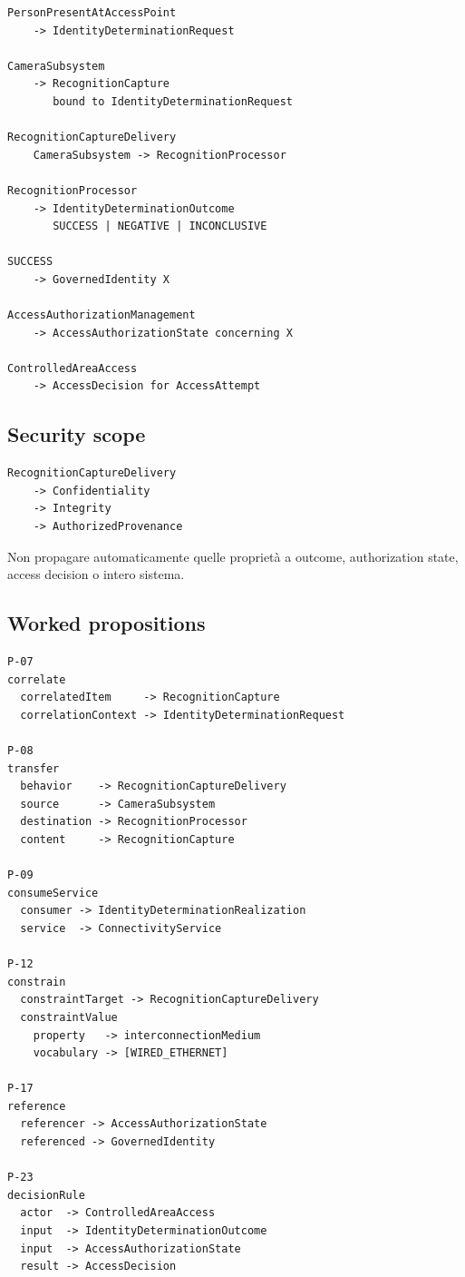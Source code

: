 \documentclass[11pt,a4paper]{article}
\begin{document}
\begin{lstlisting}
PersonPresentAtAccessPoint
    -> IdentityDeterminationRequest

CameraSubsystem
    -> RecognitionCapture
       bound to IdentityDeterminationRequest

RecognitionCaptureDelivery
    CameraSubsystem -> RecognitionProcessor

RecognitionProcessor
    -> IdentityDeterminationOutcome
       SUCCESS | NEGATIVE | INCONCLUSIVE

SUCCESS
    -> GovernedIdentity X

AccessAuthorizationManagement
    -> AccessAuthorizationState concerning X

ControlledAreaAccess
    -> AccessDecision for AccessAttempt
\end{lstlisting}

\subsection{Security scope}

\begin{lstlisting}
RecognitionCaptureDelivery
    -> Confidentiality
    -> Integrity
    -> AuthorizedProvenance
\end{lstlisting}

Non propagare automaticamente quelle proprietà a outcome, authorization state, access decision o intero sistema.

\subsection{Worked propositions}

\begin{lstlisting}
P-07
correlate
  correlatedItem     -> RecognitionCapture
  correlationContext -> IdentityDeterminationRequest

P-08
transfer
  behavior    -> RecognitionCaptureDelivery
  source      -> CameraSubsystem
  destination -> RecognitionProcessor
  content     -> RecognitionCapture

P-09
consumeService
  consumer -> IdentityDeterminationRealization
  service  -> ConnectivityService

P-12
constrain
  constraintTarget -> RecognitionCaptureDelivery
  constraintValue
    property   -> interconnectionMedium
    vocabulary -> [WIRED_ETHERNET]

P-17
reference
  referencer -> AccessAuthorizationState
  referenced -> GovernedIdentity

P-23
decisionRule
  actor  -> ControlledAreaAccess
  input  -> IdentityDeterminationOutcome
  input  -> AccessAuthorizationState
  result -> AccessDecision
\end{lstlisting}
\end{document}
